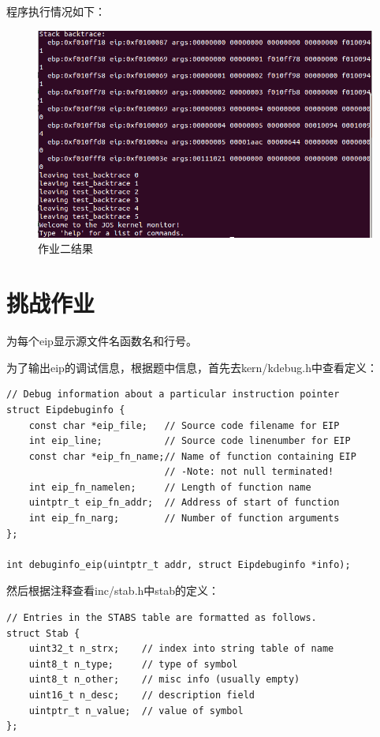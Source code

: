 \documentclass[12pt,a4paper,UTF8]{article}
\begin{document}
	程序执行情况如下：
	\begin{figure}[H]
		\centering
		\includegraphics[width = .8\linewidth]{img/7.png}
		\caption{作业二结果}
		\label{fig::figure2-7}
	\end{figure}


\section{挑战作业}

\setcounter{table}{0}
\setcounter{figure}{0}

为每个eip显示源文件名函数名和行号。

为了输出eip的调试信息，根据题中信息，首先去kern/kdebug.h中查看定义：

\begin{lstlisting}[style=CPP]
// Debug information about a particular instruction pointer
struct Eipdebuginfo {
	const char *eip_file;	// Source code filename for EIP
	int eip_line;			// Source code linenumber for EIP
	const char *eip_fn_name;// Name of function containing EIP
							// -Note: not null terminated!
	int eip_fn_namelen;		// Length of function name
	uintptr_t eip_fn_addr;	// Address of start of function
	int eip_fn_narg;		// Number of function arguments
};

int debuginfo_eip(uintptr_t addr, struct Eipdebuginfo *info);	
\end{lstlisting}

然后根据注释查看inc/stab.h中stab的定义：
\begin{lstlisting}[style=CPP]
// Entries in the STABS table are formatted as follows.
struct Stab {
	uint32_t n_strx;	// index into string table of name
	uint8_t n_type;     // type of symbol
	uint8_t n_other;    // misc info (usually empty)
	uint16_t n_desc;    // description field
	uintptr_t n_value;	// value of symbol
};
\end{lstlisting}
\end{document}
